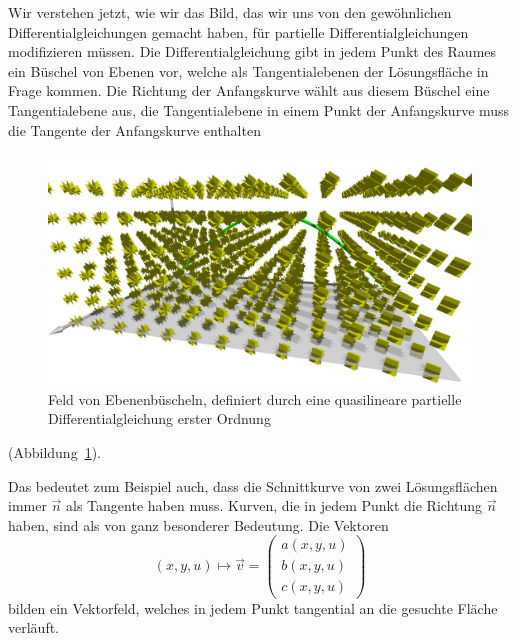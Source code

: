 Wir verstehen jetzt, wie wir das Bild, das wir uns von den gewöhnlichen
Differentialgleichungen gemacht haben, für partielle Differentialgleichungen
modifizieren müssen. Die Differentialgleichung gibt in jedem Punkt
des Raumes ein Büschel von Ebenen vor, welche als Tangentialebenen der
Lösungsfläche in Frage kommen. Die Richtung der Anfangskurve wählt aus
diesem Büschel eine Tangentialebene aus, die Tangentialebene in einem 
Punkt der Anfangskurve muss die Tangente der Anfangskurve enthalten
\begin{figure}
\begin{center}
\includegraphics[width=\hsize]{../common/3d/planes.jpg}
\end{center}
\caption{Feld von Ebenenbüscheln, definiert durch eine quasilineare
partielle Differentialgleichung erster Ordnung
\label{geometrie:ebenenbueschelfeld}}
\end{figure}
(Abbildung~\ref{geometrie:ebenenbueschelfeld}).

Das bedeutet zum Beispiel auch, dass die Schnittkurve von
zwei Lösungsflächen immer $\vec n$ als Tangente haben muss.
Kurven, die in jedem Punkt die Richtung $\vec n$ haben, sind
als von ganz besonderer Bedeutung.
Die Vektoren
\[
(x,y,u)\mapsto
\vec v=
\begin{pmatrix}
a(x,y,u)\\b(x,y,u)\\c(x,y,u)
\end{pmatrix}
\]
bilden ein Vektorfeld, welches in jedem Punkt tangential
an die gesuchte Fläche verläuft.

